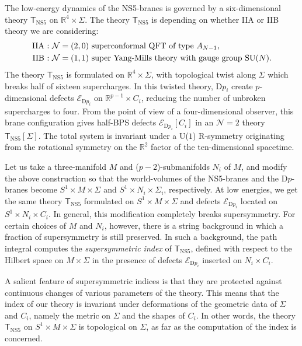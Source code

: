 The low-energy dynamics of the NS5-branes is governed by a six-dimensional
theory $\mathsf{T}_{\mathrm{NS5}}$ on $\mathbb{R}^{4}\times\Sigma$.
The theory $\mathsf{T}_{\mathrm{NS5}}$ is depending on whether IIA
or IIB theory we are considering: 
\begin{align*}
  \textrm{IIA : }    &  \textrm{\ensuremath{\mathcal{N}  =  \left(2,0\right)} superconformal QFT of type \ensuremath{A_{N-1}}},  \\
  \textrm{IIB : }    &  \textrm{\ensuremath{\mathcal{N}  =  \left(1,1\right)}   super Yang-Mills theory with gauge group SU\ensuremath{\left(N\right)}}.
\end{align*}
 The theory $\mathsf{T}_{\mathrm{NS5}}$ is formulated on $\mathbb{R}^{4}\times\Sigma$,
with topological twist along $\Sigma$ which breaks half of sixteen
supercharges. In this twisted theory, D$p_{i}$ create $p$-dimensional
defects $\mathcal{E}_{\mathrm{D}p_{i}}$ on $\mathbb{R}^{p-1}\times C_{i}$,
reducing the number of unbroken supercharges to four. From the point
of view of a four-dimensional observer, this brane configuration gives
half-BPS defects $\mathcal{E}_{\mathrm{D}p_{i}}\left[C_{i}\right]$
in an $\mathcal{N}=2$ theory $\mathsf{T}_{\mathrm{NS5}}\left[\Sigma\right]$.
The total system is invariant under a U($1$) R-symmetry originating
from the rotational symmetry on the $\mathbb{R}^{2}$ factor of the
ten-dimensional spacetime.

Let us take a three-manifold $M$ and ($p-2$)-submanifolds $N_{i}$
of $M$, and modify the above construction so that the world-volumes
of the NS5-branes and the D$p$-branes become $S^{1}\times M\times\Sigma$
and $S^{1}\times N_{i}\times\Sigma_{i}$, respectively. At low energies,
we get the same theory $\mathsf{T}_{\mathrm{NS5}}$ formulated on
$S^{1}\times M\times\Sigma$ and defects $\mathcal{E}_{\mathrm{D}p_{i}}$
located on $S^{1}\times N_{i}\times C_{i}$. In general, this modification
completely breaks supersymmetry. For certain choices of $M$ and $N_{i}$,
however, there is a string background in which a fraction of supersymmetry
is still preserved. In such a background, the path integral computes
the \emph{supersymmetric index} of $\mathsf{T}_{\mathrm{NS5}}$, defined
with respect to the Hilbert space on $M\times\Sigma$ in the presence
of defects $\mathcal{E}_{\mathrm{D}p_{i}}$ inserted on $N_{i}\times C_{i}$. 

A salient feature of supersymmetric indices is that they are protected
against continuous changes of various parameters of the theory. This
means that the index of our theory is invariant under deformations
of the geometric data of $\Sigma$ and $C_{i}$, namely the metric
on $\Sigma$ and the shapes of $C_{i}$. In other words, the theory
$\mathsf{T}_{\mathrm{NS5}}$ on $S^{1}\times M\times\Sigma$ is topological
on $\Sigma$, as far as the computation of the index is concerned. 

